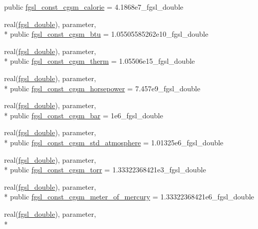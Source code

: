 \begin{DoxyCompactItemize}
public \hyperlink{classfgsl_a82882b4ac09d9b5f5cd25cff0daa2119}{fgsl\-\_\-const\-\_\-cgsm\-\_\-calorie} = 4.\-1868e7\-\_\-fgsl\-\_\-double
\item 
real(\hyperlink{classfgsl_a9af5113378e0f000eb479d3f90196ddf}{fgsl\-\_\-double}), parameter, \\*
public \hyperlink{classfgsl_a01479e6b5bfdbc02efb80e985ca837a6}{fgsl\-\_\-const\-\_\-cgsm\-\_\-btu} = 1.\-05505585262e10\-\_\-fgsl\-\_\-double
\item 
real(\hyperlink{classfgsl_a9af5113378e0f000eb479d3f90196ddf}{fgsl\-\_\-double}), parameter, \\*
public \hyperlink{classfgsl_a3a73d93cd550287bba936f1fe898b44b}{fgsl\-\_\-const\-\_\-cgsm\-\_\-therm} = 1.\-05506e15\-\_\-fgsl\-\_\-double
\item 
real(\hyperlink{classfgsl_a9af5113378e0f000eb479d3f90196ddf}{fgsl\-\_\-double}), parameter, \\*
public \hyperlink{classfgsl_a42cd4b78f557f4774c2542bb74f48dfb}{fgsl\-\_\-const\-\_\-cgsm\-\_\-horsepower} = 7.\-457e9\-\_\-fgsl\-\_\-double
\item 
real(\hyperlink{classfgsl_a9af5113378e0f000eb479d3f90196ddf}{fgsl\-\_\-double}), parameter, \\*
public \hyperlink{classfgsl_a324807e6ca282345460f8918fc39f07f}{fgsl\-\_\-const\-\_\-cgsm\-\_\-bar} = 1e6\-\_\-fgsl\-\_\-double
\item 
real(\hyperlink{classfgsl_a9af5113378e0f000eb479d3f90196ddf}{fgsl\-\_\-double}), parameter, \\*
public \hyperlink{classfgsl_a3da30a3dd34b8f19a5e653e57f41f360}{fgsl\-\_\-const\-\_\-cgsm\-\_\-std\-\_\-atmosphere} = 1.\-01325e6\-\_\-fgsl\-\_\-double
\item 
real(\hyperlink{classfgsl_a9af5113378e0f000eb479d3f90196ddf}{fgsl\-\_\-double}), parameter, \\*
public \hyperlink{classfgsl_a94ff1d0989beeed6065313b2a63530cb}{fgsl\-\_\-const\-\_\-cgsm\-\_\-torr} = 1.\-33322368421e3\-\_\-fgsl\-\_\-double
\item 
real(\hyperlink{classfgsl_a9af5113378e0f000eb479d3f90196ddf}{fgsl\-\_\-double}), parameter, \\*
public \hyperlink{classfgsl_aa8fef1711fbb6768c4d9f7061e85b117}{fgsl\-\_\-const\-\_\-cgsm\-\_\-meter\-\_\-of\-\_\-mercury} = 1.\-33322368421e6\-\_\-fgsl\-\_\-double
\item 
real(\hyperlink{classfgsl_a9af5113378e0f000eb479d3f90196ddf}{fgsl\-\_\-double}), parameter, \\*

\end{DoxyCompactItemize}
